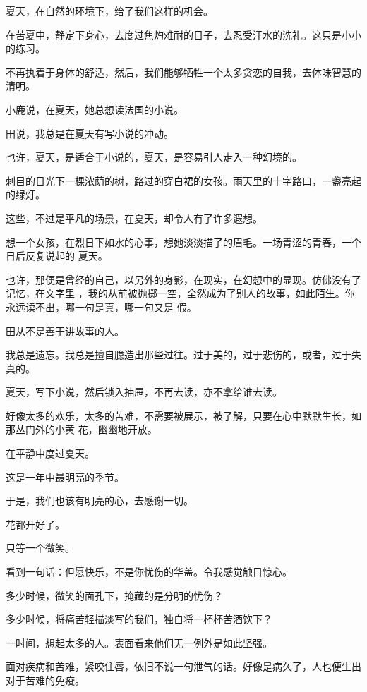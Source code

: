 \documentclass[12pt,a4paper]{article}
\begin{document}
		夏天，在自然的环境下，给了我们这样的机会。

		在苦夏中，静定下身心，去度过焦灼难耐的日子，去忍受汗水的洗礼。这只是小小的练习。\par
		不再执着于身体的舒适，然后，我们能够牺牲一个太多贪恋的自我，去体味智慧的清明。

		小鹿说，在夏天，她总想读法国的小说。\par
		田说，我总是在夏天有写小说的冲动。\par
		也许，夏天，是适合于小说的，夏天，是容易引人走入一种幻境的。\par
		刺目的日光下一棵浓荫的树，路过的穿白裙的女孩。雨天里的十字路口，一盏亮起的绿灯。\par
		这些，不过是平凡的场景，在夏天，却令人有了许多遐想。

		想一个女孩，在烈日下如水的心事，想她淡淡描了的眉毛。一场青涩的青春，一个日后反复说起的
	夏天。

		也许，那便是曾经的自己，以另外的身影，在现实，在幻想中的显现。仿佛没有了记忆，在文字里
	，我的从前被抛掷一空，全然成为了别人的故事，如此陌生。你永远读不出，哪一句是真，哪一句又是
	假。

		田从不是善于讲故事的人。\par
		我总是遗忘。我总是擅自臆造出那些过往。过于美的，过于悲伤的，或者，过于失真的。

		夏天，写下小说，然后锁入抽屉，不再去读，亦不拿给谁去读。

		好像太多的欢乐，太多的苦难，不需要被展示，被了解，只要在心中默默生长，如那丛门外的小黄
	花，幽幽地开放。

		在平静中度过夏天。\par
		这是一年中最明亮的季节。\par
		于是，我们也该有明亮的心，去感谢一切。\par
		花都开好了。\par
		只等一个微笑。

	\endwriting



		看到一句话：但愿快乐，不是你忧伤的华盖。令我感觉触目惊心。

		多少时候，微笑的面孔下，掩藏的是分明的忧伤？

		多少时候，将痛苦轻描淡写的我们，独自将一杯杯苦酒饮下？

		一时间，想起太多的人。表面看来他们无一例外是如此坚强。

		面对疾病和苦难，紧咬住唇，依旧不说一句泄气的话。好像是病久了，人也便生出对于苦难的免疫。
\end{document}
